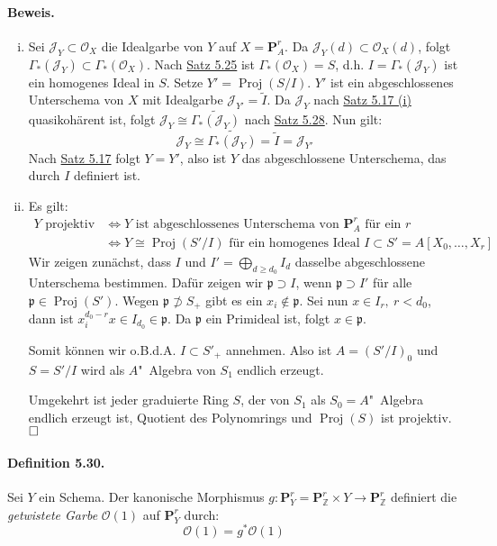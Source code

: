 \documentclass[11pt,b5paper,openany]{memoir}
\def \qed {$\hfill\square$}
\begin{document}
\paragraph{Beweis.} \begin{enumerate}[(i)]
\item Sei $\mathcal{J}_Y\subset\mathcal{O}_X$ die Idealgarbe von $Y$ auf $X=\mathbf{P}_A^r$. Da $\mathcal{J}_Y(d)\subset\mathcal{O}_X(d)$, folgt $\Gamma_\ast(\mathcal{J}_Y)\subset\Gamma_\ast(\mathcal{O}_X)$. Nach \hyperref[5.25]{Satz 5.25} ist $\Gamma_\ast(\mathcal{O}_X)=S$, d.h. $I=\Gamma_\ast(\mathcal{J}_Y)$ ist ein homogenes Ideal in $S$. Setze $Y'=\operatorname{Proj}(S/I)$. $Y'$ ist ein abgeschlossenes Unterschema von $X$ mit Idealgarbe $\mathcal{J}_{Y'}=\widetilde{I}$. Da $\mathcal{J}_Y$ nach \hyperref[5.17]{Satz 5.17 (i)} quasikohärent ist, folgt $\mathcal{J}_Y\cong\widetilde{\Gamma_\ast(\mathcal{J}_Y)}$ nach \hyperref[5.28]{Satz 5.28}. Nun gilt:
\[\mathcal{J}_Y\cong\widetilde{\Gamma_\ast(\mathcal{J}_Y)}=\widetilde{I}=\mathcal{J}_{Y'} \]
Nach \hyperref[5.17]{Satz 5.17} folgt $Y=Y'$, also ist $Y$ das abgeschlossene Unterschema, das durch $I$ definiert ist.
\item Es gilt:
\begin{align*}
Y\text{ projektiv} &\iff Y\text{ ist abgeschlossenes Unterschema von }\mathbf{P}_A^r\text{ für ein }r\\
&\iff Y\cong\operatorname{Proj}(S'/I)\text{ für ein homogenes Ideal }I\subset S' = A[X_0,\ldots,X_r]
\end{align*}
Wir zeigen zunächst, dass $I$ und $I'=\bigoplus_{d\geq d_0}I_d$ dasselbe abgeschlossene Unterschema bestimmen. Dafür zeigen wir $\mathfrak{p}\supset I$, wenn $\mathfrak{p}\supset I'$ für alle $\mathfrak{p}\in\operatorname{Proj}(S')$. Wegen $\mathfrak{p}\not\supset S_+$ gibt es ein $x_i\not\in\mathfrak{p}$. Sei nun $x\in I_r,\ r<d_0$, dann ist $x_i^{d_0-r}x\in I_{d_0}\in\mathfrak{p}$. Da $\mathfrak{p}$ ein Primideal ist, folgt $x\in\mathfrak{p}$.

Somit können wir o.B.d.A. $I\subset S'_+$ annehmen. Also ist $A=(S'/I)_0$ und $S=S'/I$ wird als $A$"~Algebra von $S_1$ endlich erzeugt. 

Umgekehrt ist jeder graduierte Ring $S$, der von $S_1$ als $S_0=A$"~Algebra endlich erzeugt ist, Quotient des Polynomrings und $\operatorname{Proj}(S)$ ist projektiv.\qed
\end{enumerate}

\paragraph{Definition 5.30.}\label{5.30} Sei $Y$ ein Schema. Der kanonische Morphismus $g:\mathbf{P}_Y^r=\mathbf{P}_\mathbb{Z}^r\times Y\to\mathbf{P}_\mathbb{Z}^r$ definiert die \textit{getwistete Garbe} $\mathcal{O}(1)$ auf $\mathbf{P}_Y^r$ durch:
\[\mathcal{O}(1)=g^\ast\mathcal{O}(1) \]
\end{document}
